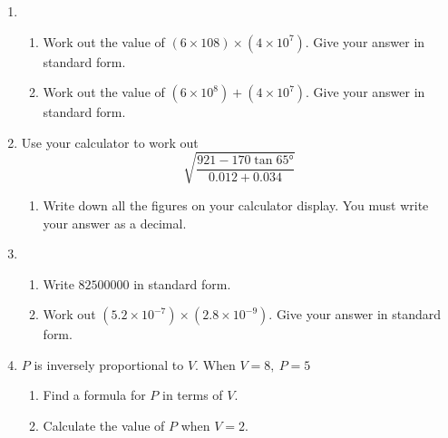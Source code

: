 \begin{enumerate}
    \item %
    \begin{enumerate}
      \item Work out the value of $(6 \times 108) \times (4 \times 10^7)$. Give your answer in standard form.\\[1.5cm]\vspace*{0pt}\hfill\dline
      \item Work out the value of $(6 \times 10^8) + (4 \times 10^7)$. Give your answer in standard form.\\[1.5cm]\vspace*{0pt}\hfill\dline            
    \end{enumerate}
    \newpage
    \item Use your calculator to work out
    $$
    \sqrt{\frac{921 - 170\tan \ang{65}}{0.012 + 0.034}}
    $$
    \begin{enumerate}
      \item Write down all the figures on your calculator display. You must write your answer as a decimal.\\[1.5cm]\vspace*{0pt}\hfill\dline    
    \end{enumerate}
    \item %
    \begin{enumerate}
      \item Write $82 500 000$ in standard form.\\[1.5cm]\vspace*{0pt}\hfill\dline
      \item Work out $(5.2 \times 10^{-7}) \times (2.8 \times 10^{-9})$. Give your answer in standard form.\\[1.5cm]\vspace*{0pt}\hfill\dline    
    \end{enumerate}
    \item $P$ is inversely proportional to $V$. When $V = 8,\ P = 5$
    \begin{enumerate}
      \item Find a formula for $P$ in terms of $V$.\\[2cm]\vspace*{0pt}\hfill\dline
      \item Calculate the value of $P$ when $V = 2$.\\[2cm]\vspace*{0pt}\hfill\dline
    \end{enumerate}

\end{enumerate}
